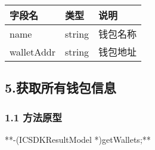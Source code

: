 \documentclass[letterpaper,10pt,english]{sphinxmanual}
\begin{document}
\begin{sphinxVerbatim}[commandchars=\\\{\}]
     
\end{sphinxVerbatim}



\begin{savenotes}\sphinxattablestart
\centering
\begin{tabulary}{\linewidth}[t]{|T|T|T|}
\hline
\sphinxstyletheadfamily 
字段名
&\sphinxstyletheadfamily 
类型
&\sphinxstyletheadfamily 
说明
\\
\hline
name
&
string
&
钱包名称
\\
\hline
walletAddr
&
string
&
钱包地址
\\
\hline
\end{tabulary}
\par
\sphinxattableend\end{savenotes}


\begin{sphinxVerbatim}[commandchars=\\\{\}]
     
\end{sphinxVerbatim}


\subsection{5.获取所有钱包信息}
\label{\detokenize{BCBWalletSDK_u63a5_u53e3_u8bf4_u660e:id29}}

\subsubsection{1.1 方法原型}
\label{\detokenize{BCBWalletSDK_u63a5_u53e3_u8bf4_u660e:id30}}
**-(ICSDKResultModel *)getWallets;**
\end{document}
